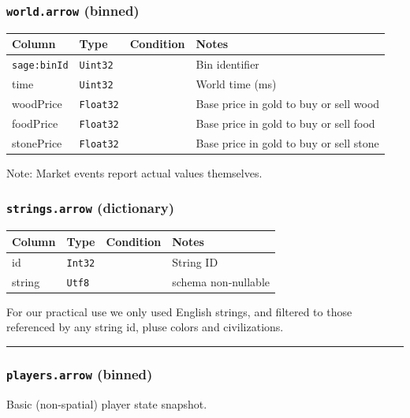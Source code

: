 \subsubsection*{\texttt{world.arrow} (binned)}

\begin{longtable}{@{}p{}p{}p{}p{}@{}}
  \toprule
  Column & Type & Condition & Notes \\
  \midrule
  \endhead
  \texttt{sage:binId} & \texttt{Uint32} & & Bin identifier \\
  time & \texttt{Uint32} & & World time (ms) \\
  woodPrice & \texttt{Float32} & & Base price in gold to buy or sell wood \\
  foodPrice & \texttt{Float32} & & Base price in gold to buy or sell food \\
  stonePrice & \texttt{Float32} & & Base price in gold to buy or sell stone \\
  \bottomrule
\end{longtable}
Note: Market events report actual values themselves.

\subsubsection*{\texttt{strings.arrow} (dictionary)}

\begin{longtable}{@{}p{}p{}p{}p{}@{}}
  \toprule
  Column & Type & Condition & Notes \\
  \midrule
  \endhead
  id & \texttt{Int32} & & String ID \\
  string & \texttt{Utf8} & & schema non‑nullable \\
  \bottomrule
\end{longtable}

For our practical use we only used English strings, and filtered to those referenced by any string id, pluse colors and civilizations.

\par\noindent\rule{\textwidth}{0.4pt}

\subsubsection*{\texttt{players.arrow} (binned)}

Basic (non-spatial) player state snapshot.

